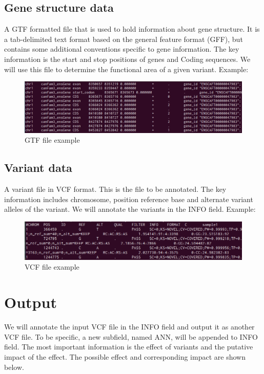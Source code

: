 \documentclass[onehalf,11pt]{beavtex}
\begin{document}
\subsection{Gene structure data}
A GTF formatted file that is used to hold information about gene structure. It is a tab-delimited text format based on the general feature format (GFF), but contains some additional conventions specific to gene information. The key information is the start and stop positions of genes and Coding sequences. We will use this file to determine the functional area of a given variant. Example:

\begin{figure}[!ht]
\centering
\includegraphics[scale=0.6]{./pic/gtf.png}
\caption{GTF file example}
\end{figure}




\subsection{Variant data}
A variant file in VCF format.  This is the file to be annotated. The key information includes chromosome, position reference base and alternate variant alleles of the variant. We will annotate the variants in the INFO field. Example:
\begin{figure}[!ht]
\centering
\includegraphics[scale=0.6]{./pic/vcf.png}
\caption{VCF file example}
\end{figure}


\section{Output}
We will annotate the input VCF file in the INFO field and output it as another VCF file. To be specific, a new subfield, named ANN, will be appended to INFO field. The most important information is the effect of variants and the putative impact of the effect. The possible effect and corresponding impact are shown below.
\end{document}
